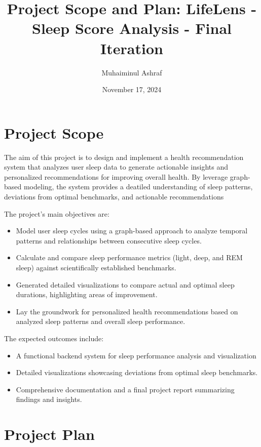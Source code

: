 \documentclass{article}
\title{Project Scope and Plan: LifeLens - Sleep Score Analysis - Final Iteration}
\author{Muhaiminul Ashraf}
\date{November 17, 2024}
\begin{document}
\maketitle

\section{Project Scope}
The aim of this project is to design and implement a health recommendation system that analyzes user sleep data to generate actionable insights and personalized recommendations for improving overall health. By leverage graph-based modeling, the system provides a deatiled understanding of sleep patterns, deviations from optimal benchmarks, and actionable recommendations

The project's main objectives are:

\begin{itemize}
    \item Model user sleep cycles using a graph-based approach to analyze temporal patterns and relationships between consecutive sleep cycles.
    \item Calculate and compare sleep performance metrics (light, deep, and REM sleep) against scientifically established benchmarks.
    \item Generated detailed visualizations to compare actual and optimal sleep durations, highlighting areas of improvement.
    \item Lay the groundwork for personalized health recommendations based on analyzed sleep patterns and overall sleep performance.
\end{itemize}



The expected outcomes include:

\begin{itemize}
    \item A functional backend system for sleep performance analysis and visualization
    \item Detailed visualizations showcasing deviations from optimal sleep benchmarks.
    \item Comprehensive documentation and a final project report summarizing findings and insights.
\end{itemize}

\section{Project Plan}
\end{document}
